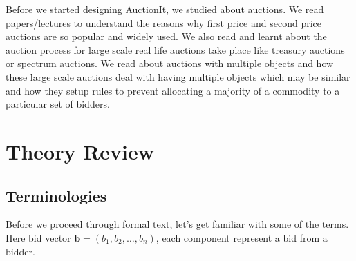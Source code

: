 \documentclass[a4paper]{article}
\begin{document}
Before we started designing AuctionIt, we studied about auctions. We read papers/lectures to understand the reasons why first price and second price auctions are so popular and widely used. We also read and learnt about the auction process for large scale real life auctions take place like treasury auctions or spectrum auctions. We read about auctions with multiple objects and how these large scale auctions deal with having multiple objects which may be similar and how they setup rules to prevent allocating a majority of a commodity to a particular set of bidders.

\pagebreak
\thispagestyle{note_1}
\section*{Theory Review}
\subsection*{Terminologies}
Before we proceed through formal text, let's get familiar with some of the terms. Here bid vector $\mathbf{b} = (b_1, b_2,\ldots,b_n)$, each component represent a bid from a bidder.
\end{document}
